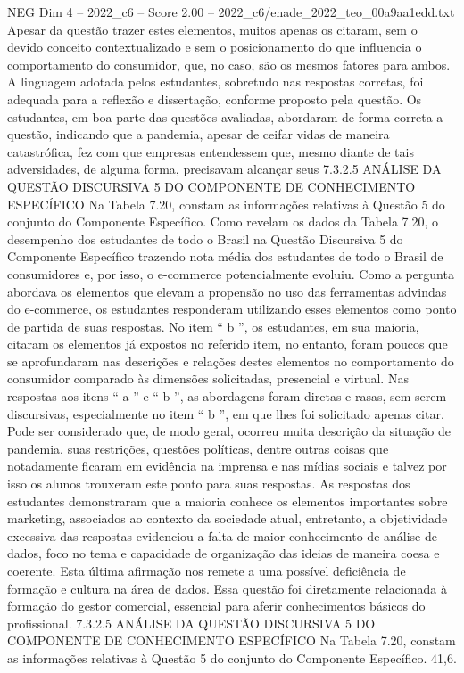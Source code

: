\begin{textsample}{NEG Dim 4 – 2022\_c6 – Score 2.00 – 2022\_c6/enade\_2022\_teo\_00a9aa1edd.txt}
Apesar da questão trazer estes elementos, muitos apenas os citaram, sem o devido conceito contextualizado e sem o posicionamento do que influencia o comportamento do consumidor, que, no caso, são os mesmos fatores para ambos.
A linguagem adotada pelos estudantes, sobretudo nas respostas corretas, foi adequada para a reflexão e dissertação, conforme proposto pela questão.
Os estudantes, em boa parte das questões avaliadas, abordaram de forma correta a questão, indicando que a pandemia, apesar de ceifar vidas de maneira catastrófica, fez com que empresas entendessem que, mesmo diante de tais adversidades, de alguma forma, precisavam alcançar seus 7.3.2.5 ANÁLISE DA QUESTÃO DISCURSIVA 5 DO COMPONENTE DE CONHECIMENTO ESPECÍFICO Na Tabela 7.20, constam as informações relativas à Questão 5 do conjunto do Componente Específico.
Como revelam os dados da Tabela 7.20, o desempenho dos estudantes de todo o Brasil na Questão Discursiva 5 do Componente Específico trazendo nota média dos estudantes de todo o Brasil de consumidores e, por isso, o e-commerce potencialmente evoluiu.
Como a pergunta abordava os elementos que elevam a propensão no uso das ferramentas advindas do e-commerce, os estudantes responderam utilizando esses elementos como ponto de partida de suas respostas.
No item “ b ”, os estudantes, em sua maioria, citaram os elementos já expostos no referido item, no entanto, foram poucos que se aprofundaram nas descrições e relações destes elementos no comportamento do consumidor comparado às dimensões solicitadas, presencial e virtual.
Nas respostas aos itens “ a ” e “ b ”, as abordagens foram diretas e rasas, sem serem discursivas, especialmente no item “ b ”, em que lhes foi solicitado apenas citar.
Pode ser considerado que, de modo geral, ocorreu muita descrição da situação de pandemia, suas restrições, questões políticas, dentre outras coisas que notadamente ficaram em evidência na imprensa e nas mídias sociais e talvez por isso os alunos trouxeram este ponto para suas respostas.
As respostas dos estudantes demonstraram que a maioria conhece os elementos importantes sobre marketing, associados ao contexto da sociedade atual, entretanto, a objetividade excessiva das respostas evidenciou a falta de maior conhecimento de análise de dados, foco no tema e capacidade de organização das ideias de maneira coesa e coerente.
Esta última afirmação nos remete a uma possível deficiência de formação e cultura na área de dados.
Essa questão foi diretamente relacionada à formação do gestor comercial, essencial para aferir conhecimentos básicos do profissional. 7.3.2.5 ANÁLISE DA QUESTÃO DISCURSIVA 5 DO COMPONENTE DE CONHECIMENTO ESPECÍFICO Na Tabela 7.20, constam as informações relativas à Questão 5 do conjunto do Componente Específico. 41,6.

\end{textsample}
